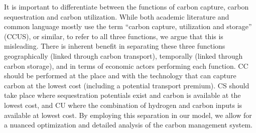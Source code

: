 \documentclass[twocolumn]{article}
\begin{document}
It is important to differentiate between the functions of carbon capture, carbon sequestration and carbon utilization. While both academic literature and common language mostly use the term ``carbon capture, utilization and storage'' (CCUS), or similar, to refer to all three functions, we argue that this is misleading. There is inherent benefit in separating these three functions geographically (linked through carbon transport), temporally (linked through carbon storage), and in terms of economic actors performing each function. CC should be performed at the place and with the technology that can capture carbon at the lowest cost (including a potential transport premium). CS should take place where sequestration potentials exist and carbon is available at the lowest cost, and CU where the combination of hydrogen and carbon inputs is available at lowest cost. By employing this separation in our model, we allow for a nuanced optimization and detailed analysis of the carbon management system.
\end{document}
